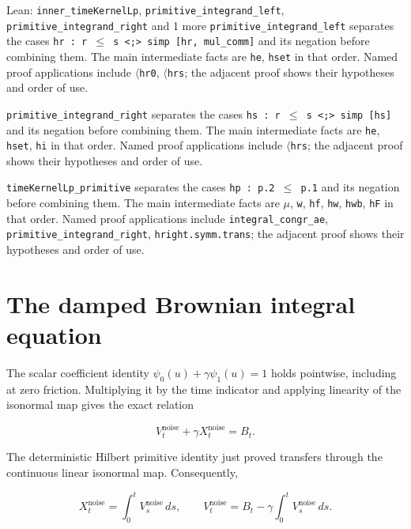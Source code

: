 \documentclass[11pt,a4paper]{article}
\begin{document}
\begin{leanbox}{Lean: \texttt{inner\_\allowbreak{}timeKernelLp}, \texttt{primitive\_\allowbreak{}integrand\_\allowbreak{}left}, \texttt{primitive\_\allowbreak{}integrand\_\allowbreak{}right} and 1 more}
\texttt{primitive\_\allowbreak{}integrand\_\allowbreak{}left} separates the cases \texttt{hr : r \ensuremath{\le} s <;> simp [hr, mul\_\allowbreak{}comm]} and its negation before combining them. The main intermediate facts are \texttt{he}, \texttt{hset} in that order. Named proof applications include \texttt{\ensuremath{\langle}hr0}, \texttt{\ensuremath{\langle}hrs}; the adjacent proof shows their hypotheses and order of use.




\texttt{primitive\_\allowbreak{}integrand\_\allowbreak{}right} separates the cases \texttt{hs : r \ensuremath{\le} s <;> simp [hs]} and its negation before combining them. The main intermediate facts are \texttt{he}, \texttt{hset}, \texttt{hi} in that order. Named proof applications include \texttt{\ensuremath{\langle}hrs}; the adjacent proof shows their hypotheses and order of use.




\texttt{time\allowbreak{}Kernel\allowbreak{}Lp\_\allowbreak{}primitive} separates the cases \texttt{hp : p.\allowbreak{}2 \ensuremath{\le} p.\allowbreak{}1} and its negation before combining them. The main intermediate facts are \texttt{\ensuremath{\mu}}, \texttt{w}, \texttt{hf}, \texttt{hw}, \texttt{hwb}, \texttt{h\allowbreak{}F} in that order. Named proof applications include \texttt{integral\_\allowbreak{}congr\_\allowbreak{}ae}, \texttt{primitive\_\allowbreak{}integrand\_\allowbreak{}right}, \texttt{hright.\allowbreak{}symm.\allowbreak{}trans}; the adjacent proof shows their hypotheses and order of use.
\end{leanbox}

\section{\texorpdfstring{The damped Brownian integral equation}{The damped Brownian integral equation}}


The scalar coefficient identity \(\psi_0(u)+\gamma\psi_1(u)=1\) holds pointwise, including at zero friction. Multiplying it by the time indicator and applying linearity of the isonormal map gives the exact relation

\[V_t^{\mathrm{noise}}+\gamma X_t^{\mathrm{noise}}=B_t.\]

The deterministic Hilbert primitive identity just proved transfers through the continuous linear isonormal map. Consequently,

\[X_t^{\mathrm{noise}}=\int_0^tV_s^{\mathrm{noise}}\,ds,\qquad V_t^{\mathrm{noise}}=B_t-\gamma\int_0^tV_s^{\mathrm{noise}}\,ds.\]
\end{document}
